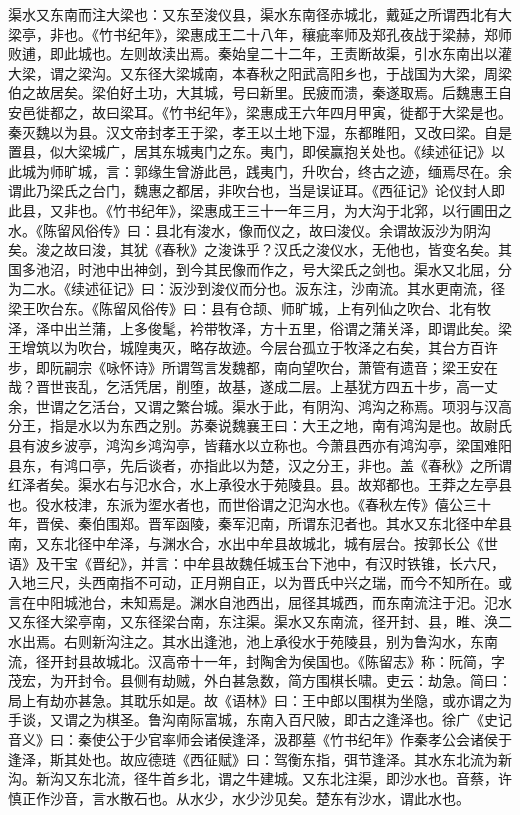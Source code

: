 \documentclass[12pt,UTF8]{ctexbook}
\begin{document}
渠水又东南而注大梁也：又东至浚仪县，渠水东南径赤城北，戴延之所谓西北有大梁亭，非也。《竹书纪年》，梁惠成王二十八年，穰疵率师及郑孔夜战于梁赫，郑师败逋，即此城也。左则故渎出焉。秦始皇二十二年，王责断故渠，引水东南出以灌大梁，谓之梁沟。又东径大梁城南，本春秋之阳武高阳乡也，于战国为大梁，周梁伯之故居矣。梁伯好土功，大其城，号曰新里。民疲而溃，秦遂取焉。后魏惠王自安邑徙都之，故曰梁耳。《竹书纪年》，梁惠成王六年四月甲寅，徙都于大梁是也。秦灭魏以为县。汉文帝封孝王于梁，孝王以土地下湿，东都睢阳，又改曰梁。自是置县，似大梁城广，居其东城夷门之东。夷门，即侯赢抱关处也。《续述征记》以此城为师旷城，言：郭缘生曾游此邑，践夷门，升吹台，终古之迹，缅焉尽在。余谓此乃梁氏之台门，魏惠之都居，非吹台也，当是误证耳。《西征记》论仪封人即此县，又非也。《竹书纪年》，梁惠成王三十一年三月，为大沟于北郛，以行圃田之水。《陈留风俗传》曰：县北有浚水，像而仪之，故曰浚仪。余谓故汳沙为阴沟矣。浚之故曰浚，其犹《春秋》之浚诛乎？汉氏之浚仪水，无他也，皆变名矣。其国多池沼，时池中出神剑，到今其民像而作之，号大梁氏之剑也。渠水又北屈，分为二水。《续述征记》曰：汳沙到浚仪而分也。汳东注，沙南流。其水更南流，径梁王吹台东。《陈留风俗传》曰：县有仓颉、师旷城，上有列仙之吹台、北有牧泽，泽中出兰蒲，上多俊髦，衿带牧泽，方十五里，俗谓之蒲关泽，即谓此矣。梁王增筑以为吹台，城隍夷灭，略存故迹。今层台孤立于牧泽之右矣，其台方百许步，即阮嗣宗《咏怀诗》所谓驾言发魏都，南向望吹台，萧管有遗音；梁王安在哉？晋世丧乱，乞活凭居，削堕，故基，遂成二层。上基犹方四五十步，高一丈余，世谓之乞活台，又谓之繁台城。渠水于此，有阴沟、鸿沟之称焉。项羽与汉高分王，指是水以为东西之别。苏秦说魏襄王曰：大王之地，南有鸿沟是也。故尉氏县有波乡波亭，鸿沟乡鸿沟亭，皆藉水以立称也。今萧县西亦有鸿沟亭，梁国难阳县东，有鸿口亭，先后谈者，亦指此以为楚，汉之分王，非也。盖《春秋》之所谓红泽者矣。渠水右与氾水合，水上承役水于苑陵县。县。故郑都也。王莽之左亭县也。役水枝津，东派为埿水者也，而世俗谓之氾沟水也。《春秋左传》僖公三十年，晋侯、秦伯围郑。晋军函陵，秦军氾南，所谓东氾者也。其水又东北径中牟县南，又东北径中牟泽，与渊水合，水出中牟县故城北，城有层台。按郭长公《世语》及干宝《晋纪》，并言：中牟县故魏任城玉台下池中，有汉时铁锥，长六尺，入地三尺，头西南指不可动，正月朔自正，以为晋氏中兴之瑞，而今不知所在。或言在中阳城池台，未知焉是。渊水自池西出，屈径其城西，而东南流注于汜。氾水又东径大梁亭南，又东径梁台南，东注渠。渠水又东南流，径开封、县，睢、涣二水出焉。右则新沟注之。其水出逢池，池上承役水于苑陵县，别为鲁沟水，东南流，径开封县故城北。汉高帝十一年，封陶舍为侯国也。《陈留志》称：阮简，字茂宏，为开封令。县侧有劫贼，外白甚急数，简方围棋长啸。吏云：劫急。简曰：局上有劫亦甚急。其耽乐如是。故《语林》曰：王中郎以围棋为坐隐，或亦谓之为手谈，又谓之为棋圣。鲁沟南际富城，东南入百尺陂，即古之逢泽也。徐广《史记音义》曰：秦使公于少官率师会诸侯逢泽，汲郡墓《竹书纪年》作秦孝公会诸侯于逢泽，斯其处也。故应德琏《西征赋》曰：驾衡东指，弭节逢泽。其水东北流为新沟。新沟又东北流，径牛首乡北，谓之牛建城。又东北注渠，即沙水也。音蔡，许慎正作沙音，言水散石也。从水少，水少沙见矣。楚东有沙水，谓此水也。
\end{document}
